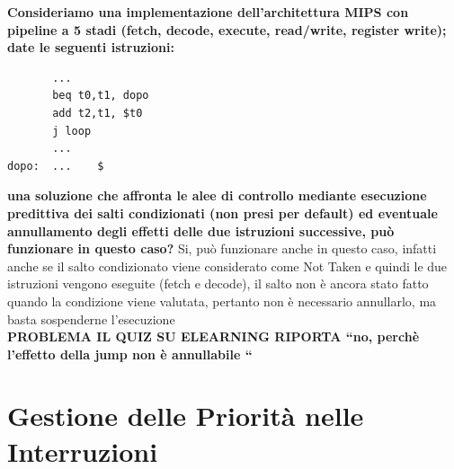\documentclass[a4paper,12pt, oneside]{book}
\begin{document}
\begin{esercizio}
  \textbf{Consideriamo una implementazione dell'architettura MIPS
    con pipeline a 5 stadi (fetch, decode, execute, read/write,
    register write); date le seguenti istruzioni:}
\begin{verbatim}
       ...
       beq t0,t1, dopo
       add t2,t1, $t0
       j loop
       ...
dopo:  ...    $
\end{verbatim}
  \textbf{una soluzione che affronta le alee di controllo mediante
    esecuzione predittiva dei salti condizionati (non presi per
    default) ed eventuale annullamento degli effetti delle due
    istruzioni successive, può funzionare in questo caso?}
  Si, può funzionare anche in questo caso, infatti anche se il
  salto condizionato viene considerato come Not Taken e quindi
  le due istruzioni vengono eseguite (fetch e decode), il salto
  non è ancora stato fatto quando la condizione viene valutata,
  pertanto non è necessario annullarlo, ma basta sospenderne
  l'esecuzione\\
  \textbf{PROBLEMA IL QUIZ SU ELEARNING RIPORTA ``no, perchè l'effetto
    della jump non è annullabile ``}
\end{esercizio}
\section{Gestione delle Priorità nelle Interruzioni}
\end{document}
